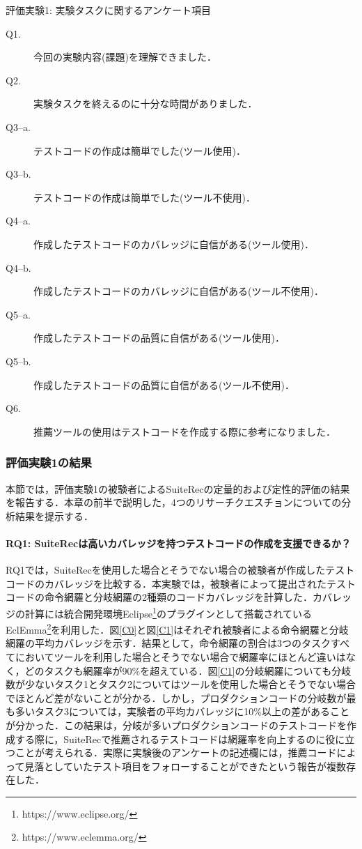 \documentclass[12pt]{jarticle} %
\begin{document}
\begin{itembox}[l]{評価実験1: 実験タスクに関するアンケート項目}
\begin{description}
\item[Q1.]今回の実験内容(課題)を理解できました．
\item[Q2.]実験タスクを終えるのに十分な時間がありました．
\item[Q3--a.]テストコードの作成は簡単でした(ツール使用)．
\item[Q3--b.]テストコードの作成は簡単でした(ツール不使用)．
\item[Q4--a.]作成したテストコードのカバレッジに自信がある(ツール使用)．
\item[Q4--b.]作成したテストコードのカバレッジに自信がある(ツール不使用)．
\item[Q5--a.]作成したテストコードの品質に自信がある(ツール使用)．
\item[Q5--b.]作成したテストコードの品質に自信がある(ツール不使用)．
\item[Q6.]推薦ツールの使用はテストコードを作成する際に参考になりました．
\end{description}

\end{itembox}

\newpage
\subsubsection{評価実験1の結果}
本節では，評価実験1の被験者による{\sf SuiteRec}の定量的および定性的評価の結果を報告する．本章の前半で説明した，4つのリサーチクエスチョンについての分析結果を提示する．

\paragraph{RQ1: {\sf SuiteRec}は高いカバレッジを持つテストコードの作成を支援できるか？}RQ1では，{\sf SuiteRec}を使用した場合とそうでない場合の被験者が作成したテストコードのカバレッジを比較する．本実験では，被験者によって提出されたテストコードの命令網羅と分岐網羅の2種類のコードカバレッジを計算した．カバレッジの計算には統合開発環境Eclipse\footnote{https://www.eclipse.org/}のプラグインとして搭載されているEclEmma\footnote{https://www.eclemma.org/}を利用した．図\ref{C0}と図\ref{C1}はそれぞれ被験者による命令網羅と分岐網羅の平均カバレッジを示す．結果として，命令網羅の割合は3つのタスクすべてにおいてツールを利用した場合とそうでない場合で網羅率にほとんど違いはなく，どのタスクも網羅率が90\%を超えている．図\ref{C1}の分岐網羅についても分岐数が少ないタスク1とタスク2についてはツールを使用した場合とそうでない場合でほとんど差がないことが分かる．しかし，プロダクションコードの分岐数が最も多いタスク3については，実験者の平均カバレッジに10\%以上の差があることが分かった．この結果は，分岐が多いプロダクションコードのテストコードを作成する際に，{\sf SuiteRec}で推薦されるテストコードは網羅率を向上するのに役に立つことが考えられる．実際に実験後のアンケートの記述欄には，推薦コードによって見落としていたテスト項目をフォローすることができたという報告が複数存在した．
\end{document}
